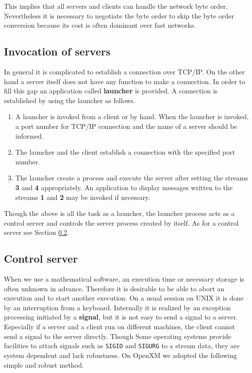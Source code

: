 This implies that all servers and clients can handle the network byte
order. Nevertheless it is necessary to negotiate the byte order to
skip the byte order conversion because its cost is often dominant over
fast networks.

\subsection{Invocation of servers}
\label{launcher}

In general it is complicated to establish a connection over TCP/IP.
On the other hand a server itself does not have any function to
make a connection. In order to fill this gap an application called
{\bf launcher} is provided. A connection is established by using
the launcher as follows.

\begin{enumerate}
\item A launcher is invoked from a client or by hand.
When the launcher is invoked, a port number for TCP/IP connection
and the name of a server should be informed.
\item The launcher and the client establish a connection with the
specified port number.
\item The launcher create a process and execute the server after
setting the streams {\bf 3} and {\bf 4} appropriately.
An application to display messages written to the streams {\bf 1} and
{\bf 2} may be invoked if necessary.
\end{enumerate}

Though the above is all the task as a launcher, the launcher process
acts as a control server and controls the server process created by
itself. As for a control server see Section \ref{control}.

\subsection{Control server}
\label{control}
When we use a mathematical software, an execution time or necessary
storage is often unknown in advance. Therefore it is desirable
to be able to abort an execution and to start another execution.
On a usual session on UNIX it is done by an interruption from a keyboard.
Internally it is realized by an exception processing initiated by
a {\bf signal}, but it is not easy to send a signal to a server.
Especially if a server and a client run on different machines,
the client cannot send a signal to the server directly.
Though Some operating systems provide facilities to attach 
signals such as {\tt SIGIO} and {\tt SIGURG} to a stream data, they are
system dependent and lack robustness.
On OpenXM we adopted the following simple and robust method.

